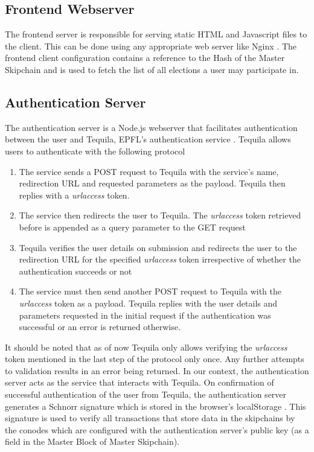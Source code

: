 \subsection{Frontend Webserver}
The frontend server is responsible for serving static HTML and Javascript files to the client. This can be done using any appropriate web server like Nginx \cite{nginx}. The frontend client configuration contains a reference to the Hash of the Master Skipchain and is used to fetch the list of all elections a user may participate in.

\subsection{Authentication Server}
The authentication server is a Node.js \cite{nodejs} webserver that facilitates authentication between the user and Tequila, EPFL’s authentication service \cite{tequila}. Tequila allows users to authenticate with the following protocol

\begin{enumerate}
  \item The service sends a POST request to Tequila with the service’s name, redirection URL and requested parameters as the payload. Tequila then replies with a \textit{urlaccess} token.
  \item The service then redirects the user to Tequila. The \textit{urlaccess} token retrieved before is appended as a query parameter to the GET request
  \item Tequila verifies the user details on submission and redirects the user to the redirection URL for the specified \textit{urlaccess} token irrespective of whether the authentication succeeds or not
  \item The service must then send another POST request to Tequila with the \textit{urlaccess} token as a payload. Tequila replies with the user details and parameters requested in the initial request if the authentication was successful or an error is returned otherwise.
\end{enumerate}

It should be noted that as of now Tequila only allows verifying the \textit{urlaccess} token mentioned in the last step of the protocol only once. Any further attempts to validation results in an error being returned. In our context, the authentication server acts as the service that interacts with Tequila. On confirmation of successful authentication of the user from Tequila, the authentication server generates a Schnorr signature which is stored in the browser’s localStorage \cite{localStorage}. This signature is used to verify all transactions that store data in the skipchains by the conodes which are configured with the authentication server’s public key (as a field in the Master Block of Master Skipchain).

